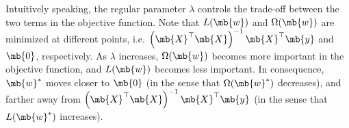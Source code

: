 \begin{exercise}
\begin{enumerate}
\begin{solution}
                Intuitively speaking, the regular parameter $\lambda$ controls the trade-off between the two terms in the objective function. 
                Note that $L(\mb{w})$ and $\Omega(\mb{w})$ are minimized at different points, i.e. $\left(\mb{X}^{\top}\mb{X}\right)^{-1}\mb{X}^{\top}\mb{y}$ and $\mb{0}$, respectively. 
                As $\lambda$ increases, $\Omega(\mb{w})$ becomes more important in the objective function, and $L(\mb{w})$ becomes less important. 
                In consequence, $\mb{w}^*$ moves closer to $\mb{0}$ (in the sense that $\Omega(\mb{w}^*)$ decreases), and farther away from $\left(\mb{X}^{\top}\mb{X}\right)^{-1}\mb{X}^{\top}\mb{y}$ (in the sense that $L(\mb{w}^*)$ increases).
                \qedhere
            \end{solution}
    \end{enumerate}
\end{exercise}
\newpage




